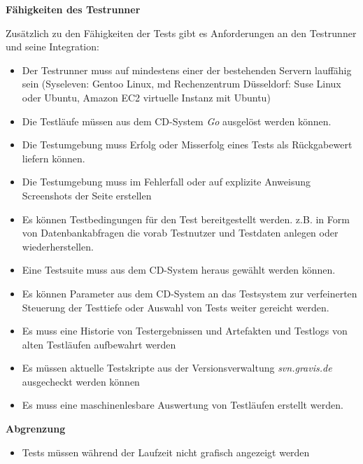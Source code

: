 \textbf{Fähigkeiten des Testrunner}

Zusätzlich zu den Fähigkeiten der Tests gibt es Anforderungen an den
Testrunner und seine Integration:

\begin{itemize}
\itemsep1pt\parskip0pt
\item
  Der Testrunner muss auf mindestens einer der bestehenden Servern
  lauffähig sein (Syseleven: Gentoo Linux, md Rechenzentrum Düsseldorf:
  Suse Linux oder Ubuntu, Amazon EC2 virtuelle Instanz mit Ubuntu)
\item
  Die Testläufe müssen aus dem CD-System \emph{Go} ausgelöst werden
  können.
\item
  Die Testumgebung muss Erfolg oder Misserfolg eines Tests als
  Rückgabewert liefern können.
\item
  Die Testumgebung muss im Fehlerfall oder auf explizite Anweisung
  Screenshots der Seite erstellen
\item
  Es können Testbedingungen für den Test bereitgestellt werden. z.B. in
  Form von Datenbankabfragen die vorab Testnutzer und Testdaten anlegen
  oder wiederherstellen.
\item
  Eine Testsuite muss aus dem CD-System heraus gewählt werden können.
\item
  Es können Parameter aus dem CD-System an das Testsystem zur
  verfeinerten Steuerung der Testtiefe oder Auswahl von Tests weiter
  gereicht werden.
\item
  Es muss eine Historie von Testergebnissen und Artefakten und Testlogs
  von alten Testläufen aufbewahrt werden
\item
  Es müssen aktuelle Testskripte aus der Versionsverwaltung
  \emph{svn.gravis.de} ausgecheckt werden können
\item
  Es muss eine maschinenlesbare Auswertung von Testläufen erstellt
  werden.
\end{itemize}

\textbf{Abgrenzung}

\begin{itemize}
\itemsep1pt\parskip0pt
\item
  Tests müssen während der Laufzeit nicht grafisch angezeigt werden
\end{itemize}
